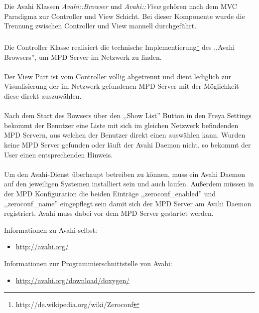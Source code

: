Die Avahi Klassen \emph{Avahi::Browser} und \emph{Avahi::View} gehören nach dem MVC Paradigma zur Controller und View Schicht. Bei
dieser Komponente wurde die Trennung zwischen Controller und View manuell durchgeführt.
\\
\\
Die Controller Klasse realisiert die technische Implementierung\footnote{http://de.wikipedia.org/wiki/Zeroconf} des ,,Avahi Browsers'', um MPD Server im Netzwerk zu finden.
\\
\\
Der View Part ist vom Controller völlig abgetrennt und dient lediglich zur Visualisierung der im Netzwerk gefundenen
MPD Server mit der Möglichkeit diese direkt auszuwählen.
\\
\\
Nach dem Start des Bowsers über den ,,Show List'' Button in den Freya Settings bekommt der Benutzer eine Liste mit sich im
gleichen Netzwerk befindenden MPD Servern, aus welchen der Benutzer direkt einen auswählen kann. Wurden keine MPD Server
gefunden oder läuft der Avahi Daemon nicht, so bekommt der User einen entsprechenden Hinweis.
\\
\\
Um den Avahi-Dienst überhaupt betreiben zu können, muss ein Avahi Daemon auf den jeweiligen
Systemen installiert sein und auch laufen. Außerdem müssen in der MPD Konfiguration die beiden Einträge ,,zeroconf\_enabled'' und ,,zeroconf\_name''
eingepflegt sein damit sich der MPD Server am Avahi Daemon registriert. Avahi muss dabei vor dem MPD Server gestartet werden.

Informationen zu Avahi selbst:
\begin{itemize}
\item \url{http://avahi.org/}
\end{itemize}

Informationen zur Programmierschnittstelle von Avahi:
\begin{itemize}
\item \url{http://avahi.org/download/doxygen/}
\end{itemize}

